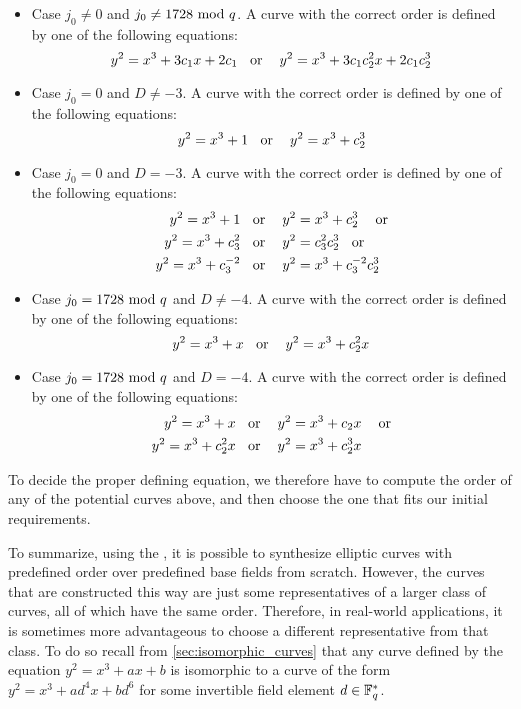 \begin{itemize}
\label{def:curve-order-frobenius}
\item Case $j_0 \neq 0 $ and $j_0\neq 1728 \text{ mod } q$. A curve with the correct order is defined by one of the following equations:
\begin{equation}
y^2 = x^3 + 3c_1x + 2c_1 \text{\;\; or \;\; } y^2 = x^3 + 3c_1c_2^2x + 2c_1c_2^3
\end{equation}
\item Case $j_0 = 0 $ and $D\neq -3$. A curve with the correct order is defined by one of the following equations:
\begin{equation}
y^2 = x^3 + 1 \text{\;\; or \;\; } y^2 = x^3 + c_2^3
\end{equation}
\item Case $j_0 = 0 $ and $D= -3$. A curve with the correct order is defined by one of the following equations:
\begin{align*}
y^2 = x^3 +1 & \text{\;\; or \;\; } y^2 = x^3 + c_2^3 \text{ \;\; or}\\  
y^2 = x^3 + c_3^2 & \text{\;\; or \;\; } y^2 = c_3^2 c_2^3 \text{\;\; or}\\
y^2 = x^3 + c_3^{-2} & \text{\;\; or \;\; }  y^2 = x^3 + c_3^{-2}c_2^3 
\end{align*}
\item Case $j_0 = 1728 \text{ mod } q $ and $D\neq -4$. A curve with the correct order is defined by one of the following equations:
\begin{equation}
y^2 = x^3 + x \text{\;\; or \;\; } y^2 = x^3 + c_2^2x
\end{equation}
\item Case $j_0 = 1728 \text{ mod } q $ and $D= -4$. A curve with the correct order is defined by one of the following equations:
\begin{align*}
y^2 = x^3 +x & \text{\;\; or \;\; } y^2 = x^3 + c_2x \text{ \;\; or}\\  
y^2 = x^3 + c_2^2x & \text{\;\; or \;\; } y^2 = x^3 + c_2^3x
\end{align*}
\end{itemize} 

To decide the proper defining  equation, we therefore have to compute the order of any of the potential curves above, and then choose the one that fits our initial requirements. 

To summarize, using the , it is possible to synthesize elliptic curves with predefined order over predefined base fields from scratch. However, the curves that are constructed this way are just some representatives of a larger class of curves, all of which have the same order. Therefore, in real-world applications, it is sometimes more advantageous to choose a different representative from that class. To do so recall from \ref{sec:isomorphic_curves} that any curve defined by the  equation $y^2 = x^3 + ax + b$ is isomorphic to a curve of the form $y^2 = x^3 + ad^4 x + bd^6$ for some invertible field element $d\in \mathbb{F}^*_q$. 

